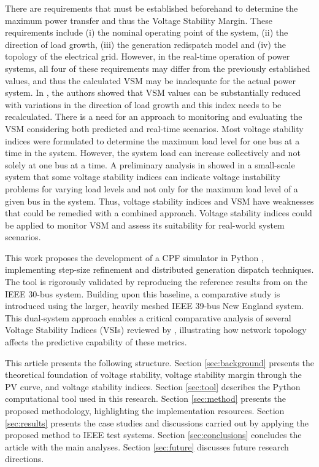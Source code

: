 \documentclass{ieeeaccess}
\begin{document}
There are requirements that must be established beforehand to determine the maximum power transfer and thus the Voltage Stability Margin. These requirements include (i) the nominal operating point of the system, (ii) the direction of load growth, (iii) the generation redispatch model and (iv) the topology of the electrical grid. However, in the real-time operation of power systems, all four of these requirements may differ from the previously established values, and thus the calculated VSM may be inadequate for the actual power system. In \cite{Bento2018b}, the authors showed that VSM values can be substantially reduced with variations in the direction of load growth and this index needs to be recalculated. There is a need for an approach to monitoring and evaluating the VSM considering both predicted and real-time scenarios. Most voltage stability indices were formulated to determine the maximum load level for one bus at a time in the system. However, the system load can increase collectively and not solely at one bus at a time. A preliminary analysis in \cite{madureira2023avaliacao} showed in a small-scale system that some voltage stability indices can indicate voltage instability problems for varying load levels and not only for the maximum load level of a given bus in the system. Thus, voltage stability indices and VSM have weaknesses that could be remedied with a combined approach. Voltage stability indices could be applied to monitor VSM and assess its suitability for real-world system scenarios.

This work proposes the development of a CPF simulator in Python \cite{thurner2018pandapower}, implementing step-size refinement and distributed generation dispatch techniques. The tool is rigorously validated by reproducing the reference results from \cite{madureira2023avaliacao} on the IEEE 30-bus system. Building upon this baseline, a comparative study is introduced using the larger, heavily meshed IEEE 39-bus New England system. This dual-system approach enables a critical comparative analysis of several Voltage Stability Indices (VSIs) reviewed by \cite{modarresi2016comprehensive}, illustrating how network topology affects the predictive capability of these metrics.

This article presents the following structure. Section \ref{sec:background} presents the theoretical foundation of voltage stability, voltage stability margin through the PV curve, and voltage stability indices. Section \ref{sec:tool} describes the Python computational tool used in this research. Section \ref{sec:method} presents the proposed methodology, highlighting the implementation resources. Section \ref{sec:results} presents the case studies and discussions carried out by applying the proposed method to IEEE test systems. Section \ref{sec:conclusions} concludes the article with the main analyses. Section \ref{sec:future} discusses future research directions.
\end{document}
